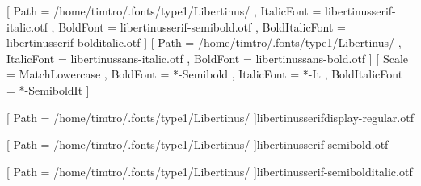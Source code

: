 \usepackage[utf8]{luainputenc}
\usepackage{tikz}
\usepackage{amsmath, commath, mathtools}
\usepackage{lualatex-math}
\usepackage{xcolor}



\usepackage{pgfornament}
\usepackage{fontspec}
\setmainfont{libertinusserif-regular.otf}[
    Path = {/home/timtro/.fonts/type1/Libertinus/}
  , ItalicFont = libertinusserif-italic.otf
  , BoldFont = libertinusserif-semibold.otf
  , BoldItalicFont = libertinusserif-bolditalic.otf ]
\setsansfont{libertinussans-regular.otf}[
    Path = {/home/timtro/.fonts/type1/Libertinus/}
  , ItalicFont = libertinussans-italic.otf
  , BoldFont = libertinussans-bold.otf ]
\setmonofont{Hasklig}[
    Scale = MatchLowercase
  , BoldFont = *-Semibold
  , ItalicFont = *-It
  , BoldItalicFont = *-SemiboldIt ]

\newfontfamily{\textdf}[
  Path = {/home/timtro/.fonts/type1/Libertinus/}
    ]{libertinusserifdisplay-regular.otf}

\newfontfamily{\textsb}[
  Path = {/home/timtro/.fonts/type1/Libertinus/}
    ]{libertinusserif-semibold.otf}

\newfontfamily{\textsbit}[
  Path = {/home/timtro/.fonts/type1/Libertinus/}
    ]{libertinusserif-semibolditalic.otf}

\ifluatex\usepackage{lualatex-math}\fi
\usepackage[math-style=ISO, partial=upright]{unicode-math}


\renewcommand{\familydefault}{\sfdefault}


\usepackage{tikz-cd}
\usetikzlibrary{arrows,arrows.meta,positioning,shapes,snakes,fit,calc}

\usepackage{tCodeListing}
